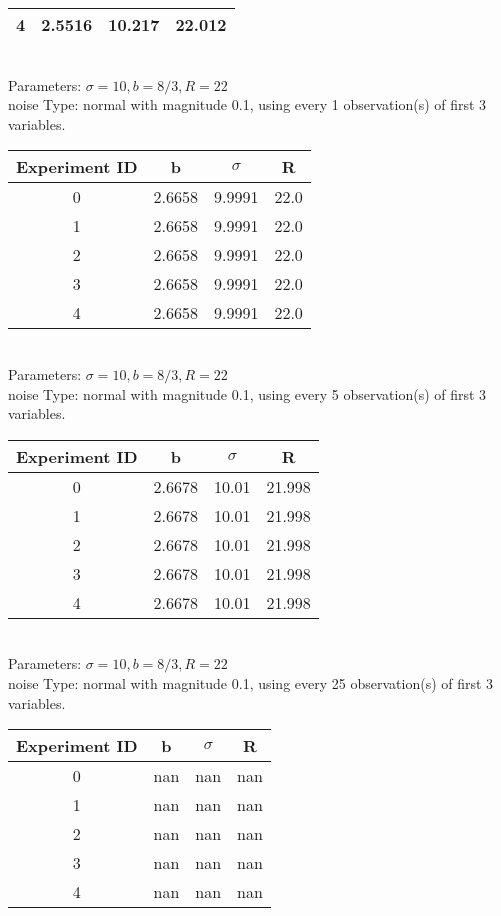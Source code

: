 \begin{multicols}{3}
\begin{tabular}{cccc}
 4 & 2.5516 & 10.217 & 22.012\\ \hline 
 \end{tabular}\\
Parameters: $\sigma=10, b=8/3, R=22$\\
noise Type: normal with magnitude 0.1, using every 1 observation(s) of first 3 variables.\\
\begin{tabular}{cccc}
\hline Experiment ID & b & $\sigma$ & R \\ \hline 
0 & 2.6658 & 9.9991 & 22.0\\ \hline 
 1 & 2.6658 & 9.9991 & 22.0\\ \hline 
 2 & 2.6658 & 9.9991 & 22.0\\ \hline 
 3 & 2.6658 & 9.9991 & 22.0\\ \hline 
 4 & 2.6658 & 9.9991 & 22.0\\ \hline 
 \end{tabular}\\
Parameters: $\sigma=10, b=8/3, R=22$\\
noise Type: normal with magnitude 0.1, using every 5 observation(s) of first 3 variables.\\
\begin{tabular}{cccc}
\hline Experiment ID & b & $\sigma$ & R \\ \hline 
0 & 2.6678 & 10.01 & 21.998\\ \hline 
 1 & 2.6678 & 10.01 & 21.998\\ \hline 
 2 & 2.6678 & 10.01 & 21.998\\ \hline 
 3 & 2.6678 & 10.01 & 21.998\\ \hline 
 4 & 2.6678 & 10.01 & 21.998\\ \hline 
 \end{tabular}\\
Parameters: $\sigma=10, b=8/3, R=22$\\
noise Type: normal with magnitude 0.1, using every 25 observation(s) of first 3 variables.\\
\begin{tabular}{cccc}
\hline Experiment ID & b & $\sigma$ & R \\ \hline 
0 & nan & nan & nan\\ \hline 
 1 & nan & nan & nan\\ \hline 
 2 & nan & nan & nan\\ \hline 
 3 & nan & nan & nan\\ \hline 
 4 & nan & nan & nan\\ \hline 

\end{tabular}
\end{multicols}
